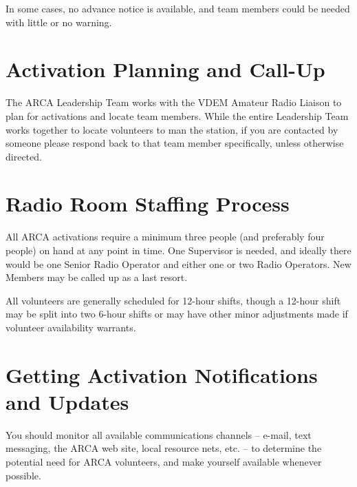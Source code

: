 \documentclass[pdflatex,letterpaper,twoside,12pt]{book}
\begin{document}
In some cases, no advance notice is available, and team members could be needed with little or no warning.


\section{Activation Planning and Call-Up}

The ARCA Leadership Team works with the VDEM Amateur Radio Liaison to plan for activations and locate team members.  While the entire Leadership Team works together to locate volunteers to man the station, if you are contacted by someone please respond back to that team member specifically, unless otherwise directed.


\section{Radio Room Staffing Process}

All ARCA activations require a minimum three people (and preferably four people) on hand at any point in time.  One Supervisor is needed, and ideally there would be one Senior Radio Operator and either one or two Radio Operators.  New Members may be called up as a last resort.

All volunteers are generally scheduled for 12-hour shifts, though a 12-hour shift may be split into two 6-hour shifts or may have other minor adjustments made if volunteer availability warrants.


\section{Getting Activation Notifications and Updates}

You should monitor all available communications channels – e-mail, text messaging, the ARCA web site, local resource nets, etc. – to determine the potential need for ARCA volunteers, and make yourself available whenever possible.
\end{document}
